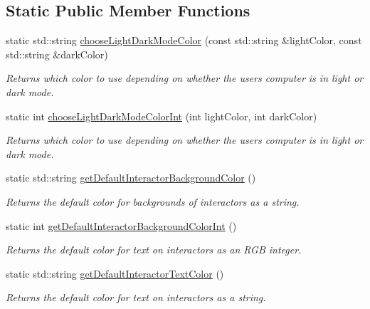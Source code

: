 \subsection*{Static Public Member Functions}
\begin{DoxyCompactItemize}
\item 
static std\+::string \mbox{\hyperlink{classGWindow_a14da494e7a105db49b15cbd11db68774}{choose\+Light\+Dark\+Mode\+Color}} (const std\+::string \&light\+Color, const std\+::string \&dark\+Color)
\begin{DoxyCompactList}\small\item\em Returns which color to use depending on whether the user\textquotesingle{}s computer is in light or dark mode. \end{DoxyCompactList}\item 
static int \mbox{\hyperlink{classGWindow_a8364f5a4c8622d07ccc83bdc3acc4f19}{choose\+Light\+Dark\+Mode\+Color\+Int}} (int light\+Color, int dark\+Color)
\begin{DoxyCompactList}\small\item\em Returns which color to use depending on whether the user\textquotesingle{}s computer is in light or dark mode. \end{DoxyCompactList}\item 
static std\+::string \mbox{\hyperlink{classGWindow_a43cda7f9c8a6eb4ff1519fb99a3c2901}{get\+Default\+Interactor\+Background\+Color}} ()
\begin{DoxyCompactList}\small\item\em Returns the default color for backgrounds of interactors as a string. \end{DoxyCompactList}\item 
static int \mbox{\hyperlink{classGWindow_a04e520567df471df236f1efeb5ea4d90}{get\+Default\+Interactor\+Background\+Color\+Int}} ()
\begin{DoxyCompactList}\small\item\em Returns the default color for text on interactors as an R\+GB integer. \end{DoxyCompactList}\item 
static std\+::string \mbox{\hyperlink{classGWindow_aa65fc0c6ac0c5ebeafffe99e35face97}{get\+Default\+Interactor\+Text\+Color}} ()
\begin{DoxyCompactList}\small\item\em Returns the default color for text on interactors as a string. \end{DoxyCompactList}\item 

\end{DoxyCompactItemize}
